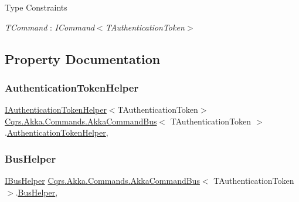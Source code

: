 \begin{Desc}
\item[Type Constraints]\begin{description}
\item[{\em T\+Command} : {\em I\+Command$<$T\+Authentication\+Token$>$}]\end{description}
\end{Desc}


\subsection{Property Documentation}
\mbox{\label{classCqrs_1_1Akka_1_1Commands_1_1AkkaCommandBus_ad74a628484d215ec6daab02b20ac1dbe_ad74a628484d215ec6daab02b20ac1dbe}} 
\subsubsection{\texorpdfstring{Authentication\+Token\+Helper}{AuthenticationTokenHelper}}
{\footnotesize\ttfamily \hyperlink{interfaceCqrs_1_1Authentication_1_1IAuthenticationTokenHelper}{I\+Authentication\+Token\+Helper}$<$T\+Authentication\+Token$>$ \hyperlink{classCqrs_1_1Akka_1_1Commands_1_1AkkaCommandBus}{Cqrs.\+Akka.\+Commands.\+Akka\+Command\+Bus}$<$ T\+Authentication\+Token $>$.\hyperlink{classCqrs_1_1Authentication_1_1AuthenticationTokenHelper}{Authentication\+Token\+Helper}\hspace{0.3cm}{\ttfamily [get]}, {\ttfamily [protected]}}

\mbox{\label{classCqrs_1_1Akka_1_1Commands_1_1AkkaCommandBus_abe5501970c0e39abb9a70670ab985fdc_abe5501970c0e39abb9a70670ab985fdc}} 
\subsubsection{\texorpdfstring{Bus\+Helper}{BusHelper}}
{\footnotesize\ttfamily \hyperlink{interfaceCqrs_1_1Bus_1_1IBusHelper}{I\+Bus\+Helper} \hyperlink{classCqrs_1_1Akka_1_1Commands_1_1AkkaCommandBus}{Cqrs.\+Akka.\+Commands.\+Akka\+Command\+Bus}$<$ T\+Authentication\+Token $>$.\hyperlink{classCqrs_1_1Bus_1_1BusHelper}{Bus\+Helper}\hspace{0.3cm}{\ttfamily [get]}, {\ttfamily [protected]}}

